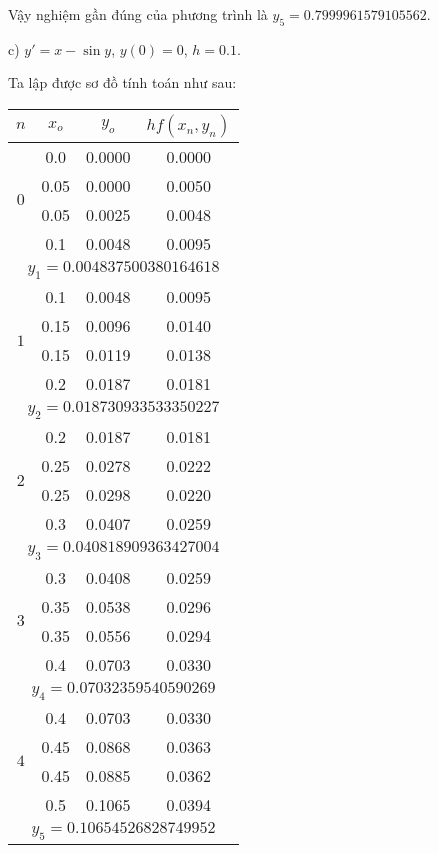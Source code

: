 Vậy nghiệm gần đúng của phương trình là $y_5 = 0.7999961579105562$.\par

c) $y'=x-\sin y$, $y(0)=0$, $h=0.1$.\par
Ta lập được sơ đồ tính toán như sau:

\begin{longtable}{|c|c|c|c|}\hline
$n$&$x_o$ &$y_o$ &$hf(x_n,y_n)$ \\ \hline
\endhead

\multirow{4}{*}{$0$}
&0.0 &0.0000 &0.0000 \\ \cline{2-4}
&0.05 &0.0000 &0.0050 \\ \cline{2-4}
&0.05 &0.0025 &0.0048 \\ \cline{2-4}
&0.1 &0.0048 &0.0095 \\ \hline
\multicolumn{4}{|c|}{$y_1 = 0.004837500380164618$} \\ \hline

\multirow{4}{*}{$1$}
&0.1 &0.0048 &0.0095 \\ \cline{2-4}
&0.15 &0.0096 &0.0140 \\ \cline{2-4}
&0.15 &0.0119 &0.0138 \\ \cline{2-4}
&0.2 &0.0187 &0.0181 \\ \hline
\multicolumn{4}{|c|}{$y_2 = 0.018730933533350227$} \\ \hline

&0.2 &0.0187 &0.0181 \\ \cline{2-4}
\multirow{2}{*}{$2$}
&0.25 &0.0278 &0.0222 \\ \cline{2-4}
&0.25 &0.0298 &0.0220 \\ \cline{2-4}
&0.3 &0.0407 &0.0259 \\ \hline
\multicolumn{4}{|c|}{$y_3 = 0.040818909363427004$} \\ \hline

\multirow{4}{*}{$3$}
&0.3 &0.0408 &0.0259 \\ \cline{2-4}
&0.35 &0.0538 &0.0296 \\ \cline{2-4}
&0.35 &0.0556 &0.0294 \\ \cline{2-4}
&0.4 &0.0703 &0.0330 \\ \hline
\multicolumn{4}{|c|}{$y_4 = 0.07032359540590269$} \\ \hline

\multirow{4}{*}{$4$}
&0.4 &0.0703 &0.0330 \\ \cline{2-4}
&0.45 &0.0868 &0.0363 \\ \cline{2-4}
&0.45 &0.0885 &0.0362 \\ \cline{2-4}
&0.5 &0.1065 &0.0394 \\ \hline
\multicolumn{4}{|c|}{$y_5 = 0.10654526828749952$} \\ \hline


\end{longtable}
